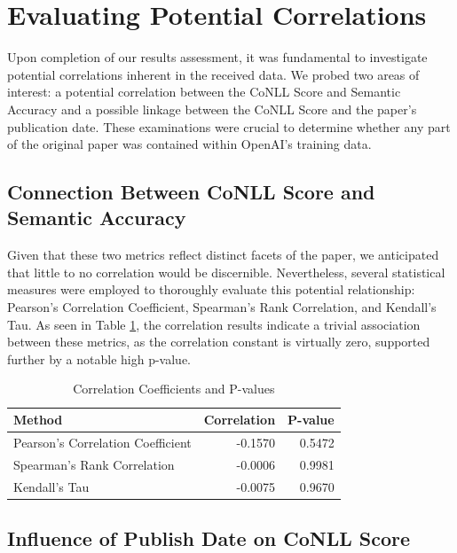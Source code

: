 \section{Evaluating Potential Correlations}

Upon completion of our results assessment, it was fundamental to investigate potential correlations inherent in the received data. We probed two areas of interest: a potential correlation between the CoNLL Score and Semantic Accuracy and a possible linkage between the CoNLL Score and the paper's publication date. These examinations were crucial to determine whether any part of the original paper was contained within OpenAI's training data.

\subsection{Connection Between CoNLL Score and Semantic Accuracy}

Given that these two metrics reflect distinct facets of the paper, we anticipated that little to no correlation would be discernible. Nevertheless, several statistical measures were employed to thoroughly evaluate this potential relationship: Pearson's Correlation Coefficient, Spearman's Rank Correlation, and Kendall's Tau. As seen in Table \ref{tab:spearman}, the correlation results indicate a trivial association between these metrics, as the correlation constant is virtually zero, supported further by a notable high p-value.

\begin{table}[htpb]
    \centering
    \caption{Correlation Coefficients and P-values}\label{tab:spearman}
        \begin{tabular}{lrr}
        \hline
        Method & Correlation & P-value \\
        \hline
        Pearson's Correlation Coefficient & -0.1570 & 0.5472 \\
        Spearman's Rank Correlation & -0.0006 & 0.9981 \\
        Kendall's Tau & -0.0075 & 0.9670 \\
        \hline
    \end{tabular}
\end{table}

\subsection{Influence of Publish Date on CoNLL Score}

